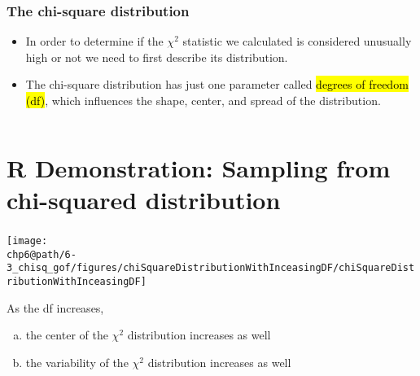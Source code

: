 \documentclass[slidestop,compress,mathserif]{beamer}
\makeatletter
\def\chp6@path{../../Chp 6}
\makeatother
\begin{document}

\begin{frame}
\frametitle{The chi-square distribution}

\begin{itemize}

\item In order to determine if the $\chi^2$ statistic we calculated is considered unusually high or not we need to first describe its distribution.

\pause

\item The chi-square distribution has just one parameter called \hl{degrees of freedom (df)}, which influences the shape, center, and spread of the distribution. \\

\end{itemize}

\pause

$\:$ \\


\end{frame}


\section{R Demonstration: Sampling from chi-squared distribution}


\begin{frame}
\frametitle{}


\begin{center}
\texttt{[image: \\chp6@path/6-3\_chisq\_gof/figures/chiSquareDistributionWithInceasingDF/chiSquareDistributionWithInceasingDF]}
\end{center}

As the df increases,
\begin{enumerate}[(a)]
\item the center of the $\chi^2$ distribution increases as well
\item the variability of the $\chi^2$ distribution increases as well
\end{enumerate}

\end{frame}
\end{document}
